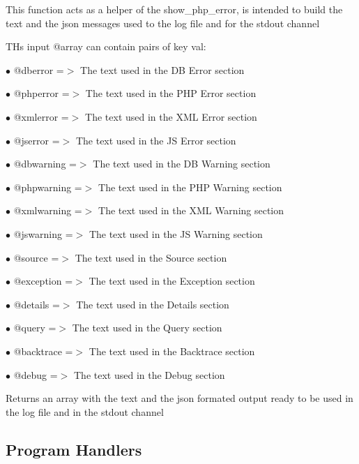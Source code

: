 \documentclass[a4paper]{book}
\begin{document}
This function acts as a helper of the show\_php\_error, is intended to build
the text and the json messages used to the log file and for the stdout channel

THs input @array can contain pairs of key val:

\begin{compactitem}
\item[\color{myblue}$\bullet$] @dberror    =$>$ The text used in the DB Error section
\item[\color{myblue}$\bullet$] @phperror   =$>$ The text used in the PHP Error section
\item[\color{myblue}$\bullet$] @xmlerror   =$>$ The text used in the XML Error section
\item[\color{myblue}$\bullet$] @jserror    =$>$ The text used in the JS Error section
\item[\color{myblue}$\bullet$] @dbwarning  =$>$ The text used in the DB Warning section
\item[\color{myblue}$\bullet$] @phpwarning =$>$ The text used in the PHP Warning section
\item[\color{myblue}$\bullet$] @xmlwarning =$>$ The text used in the XML Warning section
\item[\color{myblue}$\bullet$] @jswarning  =$>$ The text used in the JS Warning section
\item[\color{myblue}$\bullet$] @source     =$>$ The text used in the Source section
\item[\color{myblue}$\bullet$] @exception  =$>$ The text used in the Exception section
\item[\color{myblue}$\bullet$] @details    =$>$ The text used in the Details section
\item[\color{myblue}$\bullet$] @query      =$>$ The text used in the Query section
\item[\color{myblue}$\bullet$] @backtrace  =$>$ The text used in the Backtrace section
\item[\color{myblue}$\bullet$] @debug      =$>$ The text used in the Debug section
\end{compactitem}

Returns an array with the text and the json formated output ready to be used
in the log file and in the stdout channel

\hypertarget{toc106}{}
\subsection{Program Handlers}
\end{document}
